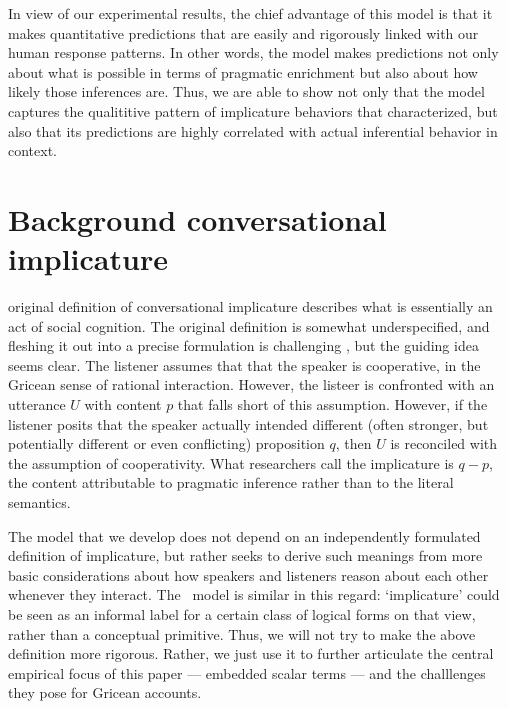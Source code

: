 \documentclass{article}
\begin{document}
In view of our experimental results, the chief advantage of this model
is that it makes quantitative predictions that are easily and
rigorously linked with our human response patterns.  In other words,
the model makes predictions not only about what is possible in terms
of pragmatic enrichment but also about how likely those inferences
are. Thus, we are able to show not only that the model captures the
qualititive pattern of implicature behaviors that
\citeauthor{Chemla:Spector:2011} characterized, but also that its
predictions are highly correlated with actual inferential behavior in
context.



\section{Background  conversational implicature}\label{sec:ci}

 original definition of conversational implicature
describes what is essentially an act of social cognition. The original
definition is somewhat underspecified, and fleshing it out into a
precise formulation is challenging \citep{Hirschberg85}, but the
guiding idea seems clear.  The listener assumes that that the speaker
is cooperative, in the Gricean sense of rational interaction. However,
the listeer is confronted with an utterance $U$ with content $p$ that
falls short of this assumption. However, if the listener posits that
the speaker actually intended different (often stronger, but
potentially different or even conflicting) proposition $q$, then $U$
is reconciled with the assumption of cooperativity. What researchers
call the implicature is $q - p$, the content attributable to pragmatic
inference rather than to the literal semantics.

The model that we develop does not depend on an independently
formulated definition of implicature, but rather seeks to derive such
meanings from more basic considerations about how speakers and
listeners reason about each other whenever they interact. The \CFS\
model is similar in this regard: `implicature' could be seen as an
informal label for a certain class of logical forms on that view,
rather than a conceptual primitive. Thus, we will not try to make the
above definition more rigorous. Rather, we just use it to further
articulate the central empirical focus of this paper --- embedded
scalar terms --- and the challlenges they pose for Gricean accounts.
\end{document}
